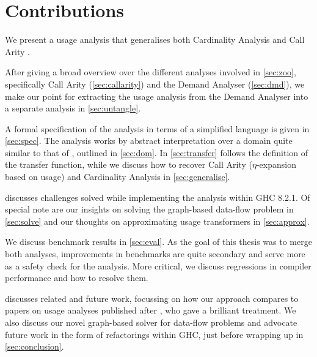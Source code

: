 \section{Contributions}\label{sec:contrib}

We present a usage analysis that generalises both Cardinality Analysis \parencite{card} and Call Arity \parencite{callarity}.

After giving a broad overview over the different analyses involved in \cref{sec:zoo}, specifically Call Arity (\cref{sec:callarity}) and the Demand Analyser (\cref{sec:dmd}), we make our point for extracting the usage analysis from the Demand Analyser into a separate analysis in \ref{sec:untangle}.

A formal specification of the analysis in terms of a simplified language is given in \cref{sec:spec}.
The analysis works by abstract interpretation over a domain quite similar to that of \textcite{card}, outlined in \cref{sec:dom}.
In \cref{sec:transfer} follows the definition of the transfer function, while we discuss how to recover Call Arity (\eg $\eta$-expansion based on usage) and Cardinality Analysis in \cref{sec:generalise}.

 discusses challenges solved while implementing the analysis within GHC 8.2.1.
Of special note are our insights on solving the graph-based data-flow problem in \cref{sec:solve} and our thoughts on approximating usage transformers in \cref{sec:approx}.

We discuss benchmark results in \cref{sec:eval}.
As the goal of this thesis was to merge both analyses, improvements in benchmarks are quite secondary and serve more as a safety check for the analysis.
More critical, we discuss regressions in compiler performance and how to resolve them.

 discusses related and future work, focussing on how our approach compares to papers on usage analyses published after \textcite{card}, who gave a brilliant treatment.
We also discuss our novel graph-based solver for data-flow problems and advocate future work in the form of refactorings within GHC, just before wrapping up in \cref{sec:conclusion}.

